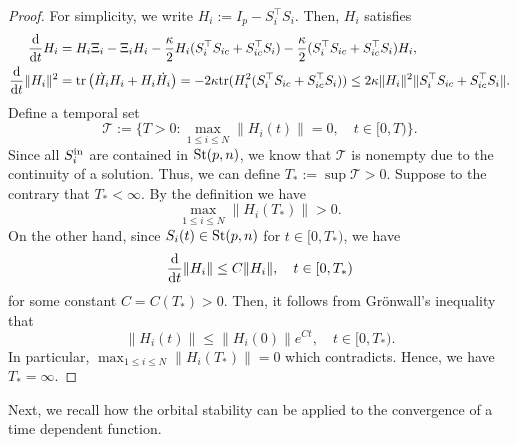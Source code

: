 \documentclass[11pt,reqno]{amsart}
\numberwithin{figure}{section}
\newcommand{\kp}{\kappa}
\newcommand{\dd}{  {\textup{d}} }
\newcommand{\dt} {    {  \textup{d}t   }    }
\newcommand{\St}{  {\textup{St}}(p,n) }
\newcommand{\init}{  {\textup{in}} }
\begin{document}
\begin{proof} 
For simplicity, we write $H_i := I_p - S_i^\top S_i$. Then, $H_i$ satisfies
\[
\begin{aligned}
\frac\dd\dt H_i%
&=H_i \Xi_i-\Xi_i H_i-\frac{\kappa}{2}H_i(S_i^\top S_{ic}+S_{ic}^\top S_i)-\frac{\kappa}{2}(S_i^\top S_{ic}+S_{ic}^\top S_i)H_i,\\
\frac \dd\dt \|H_i\|^2&=\mbox{tr}\left(\dot{H_i}H_i+H_i\dot{H_i}\right)=-2\kappa\mbox{tr}(H_i^2(S_i^\top S_{ic}+S_{ic}^\top S_i))\leq 2\kappa \|H_i\|^2\|S_i^\top S_{ic}+S_{ic}^\top S_i\|.
\end{aligned}%
\]
Define a temporal set 
\[
\mathcal T := \{ T>0: \max_{1\leq i \leq N } \|H_i(t)\| = 0,\quad t\in [0,T) \}.
\]
Since all $S_i^\init$ are contained in $\St$, we know that $\mathcal T$ is nonempty due to the continuity of a solution. Thus, we can define $T_*:= \sup \mathcal T>0$. Suppose to the contrary that $T_*<\infty$. By the definition we have
\[
\max_{1\leq i \leq N } \|H_i (T_*)\|>0.
\]
On the other hand, since $S_i(t) \in \St$ for $t\in [0,T_*)$, we have
\[
\frac\dd\dt \|H_i\| \leq C \|H_i\|,\quad t\in [0,T_*)
\]
for some constant $C=C(T_*)>0$. Then, it follows from Gr\"onwall's inequality that 
\[
\|H_i(t) \| \leq \|H_i(0)\|e^{Ct}, \quad t\in [0,T_*).
\]
In particular, $\max_{1\leq i \leq N} \|H_i(T_*)\| =0$ which contradicts. Hence, we have $T_* = \infty$. 
\end{proof}


Next, we recall how the orbital stability can be applied to the convergence of a time dependent function. %
\end{document}
